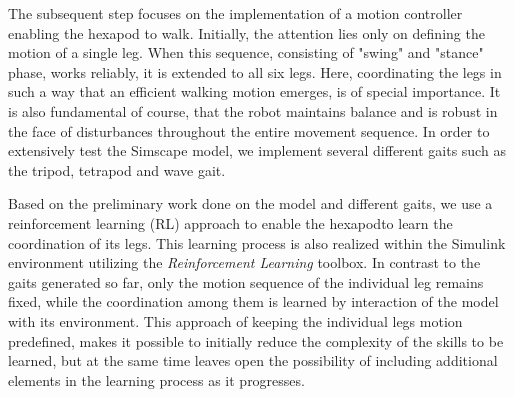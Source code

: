 The subsequent step focuses on the implementation of a motion controller enabling the hexapod to walk.
Initially, the attention lies only on defining the motion of a single leg.
When this sequence, consisting of "swing" and "stance" phase, works reliably, it is extended to all six legs.
Here, coordinating the legs in such a way that an efficient walking motion emerges, is of special importance.
It is also fundamental of course, that the robot maintains balance and is robust in the face of disturbances throughout the entire movement sequence.
In order to extensively test the Simscape model, we implement several different gaits such as the tripod, tetrapod and wave gait.

Based on the preliminary work done on the model and different gaits, we use a reinforcement learning (RL) approach to enable the hexapodto learn the coordination of its legs.
This learning process is also realized within the Simulink environment utilizing the \textit{Reinforcement Learning} toolbox.
In contrast to the gaits generated so far, only the motion sequence of the individual leg remains fixed, while the coordination among them is learned by interaction of the model with its environment. 
This approach of keeping the individual legs motion predefined, makes it possible to initially reduce the complexity of the skills to be learned, but at the same time leaves open the possibility of including additional elements in the learning process as it progresses.

